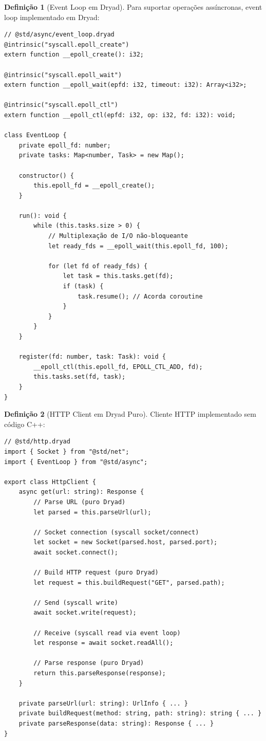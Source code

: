 \documentclass[12pt,a4paper]{article}
\theoremstyle{definition}
\newtheorem{definition}{Definição}[section]
\begin{document}
\begin{definition}[Event Loop em Dryad]
Para suportar operações assíncronas, event loop implementado em Dryad:

\begin{verbatim}
// @std/async/event_loop.dryad
@intrinsic("syscall.epoll_create")
extern function __epoll_create(): i32;

@intrinsic("syscall.epoll_wait")
extern function __epoll_wait(epfd: i32, timeout: i32): Array<i32>;

@intrinsic("syscall.epoll_ctl")
extern function __epoll_ctl(epfd: i32, op: i32, fd: i32): void;

class EventLoop {
    private epoll_fd: number;
    private tasks: Map<number, Task> = new Map();
    
    constructor() {
        this.epoll_fd = __epoll_create();
    }
    
    run(): void {
        while (this.tasks.size > 0) {
            // Multiplexação de I/O não-bloqueante
            let ready_fds = __epoll_wait(this.epoll_fd, 100);
            
            for (let fd of ready_fds) {
                let task = this.tasks.get(fd);
                if (task) {
                    task.resume(); // Acorda coroutine
                }
            }
        }
    }
    
    register(fd: number, task: Task): void {
        __epoll_ctl(this.epoll_fd, EPOLL_CTL_ADD, fd);
        this.tasks.set(fd, task);
    }
}
\end{verbatim}
\end{definition}

\begin{definition}[HTTP Client em Dryad Puro]
Cliente HTTP implementado sem código C++:

\begin{verbatim}
// @std/http.dryad
import { Socket } from "@std/net";
import { EventLoop } from "@std/async";

export class HttpClient {
    async get(url: string): Response {
        // Parse URL (puro Dryad)
        let parsed = this.parseUrl(url);
        
        // Socket connection (syscall socket/connect)
        let socket = new Socket(parsed.host, parsed.port);
        await socket.connect();
        
        // Build HTTP request (puro Dryad)
        let request = this.buildRequest("GET", parsed.path);
        
        // Send (syscall write)
        await socket.write(request);
        
        // Receive (syscall read via event loop)
        let response = await socket.readAll();
        
        // Parse response (puro Dryad)
        return this.parseResponse(response);
    }
    
    private parseUrl(url: string): UrlInfo { ... }
    private buildRequest(method: string, path: string): string { ... }
    private parseResponse(data: string): Response { ... }
}
\end{verbatim}
\end{definition}
\end{document}
